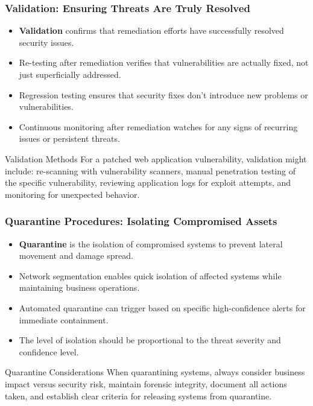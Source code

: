 \documentclass{beamer}
\begin{document}
\begin{frame}
\frametitle{Validation: Ensuring Threats Are Truly Resolved}
\begin{itemize}
\item \textbf{Validation} confirms that remediation efforts have successfully resolved security issues.
\item Re-testing after remediation verifies that vulnerabilities are actually fixed, not just superficially addressed.
\item Regression testing ensures that security fixes don't introduce new problems or vulnerabilities.
\item Continuous monitoring after remediation watches for any signs of recurring issues or persistent threats.
\end{itemize}

\begin{exampleblock}{Validation Methods}
For a patched web application vulnerability, validation might include: re-scanning with vulnerability scanners, manual penetration testing of the specific vulnerability, reviewing application logs for exploit attempts, and monitoring for unexpected behavior.
\end{exampleblock}
\end{frame}

\begin{frame}
\frametitle{Quarantine Procedures: Isolating Compromised Assets}
\begin{itemize}
\item \textbf{Quarantine} is the isolation of compromised systems to prevent lateral movement and damage spread.
\item Network segmentation enables quick isolation of affected systems while maintaining business operations.
\item Automated quarantine can trigger based on specific high-confidence alerts for immediate containment.
\item The level of isolation should be proportional to the threat severity and confidence level.
\end{itemize}

\begin{alertblock}{Quarantine Considerations}
When quarantining systems, always consider business impact versus security risk, maintain forensic integrity, document all actions taken, and establish clear criteria for releasing systems from quarantine.
\end{alertblock}
\end{frame}
\end{document}
